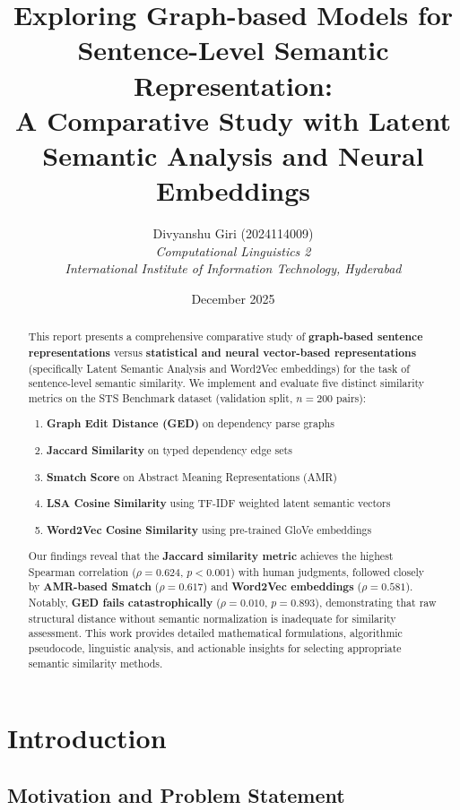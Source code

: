 \documentclass[11pt,a4paper]{article}
\title{Exploring Graph-based Models for Sentence-Level Semantic Representation:\\
A Comparative Study with Latent Semantic Analysis and Neural Embeddings}
\author{Divyanshu Giri (2024114009)\\
\textit{Computational Linguistics 2}\\
\textit{International Institute of Information Technology, Hyderabad}}
\date{December 2025}
\begin{document}
\maketitle

\begin{abstract}
This report presents a comprehensive comparative study of \textbf{graph-based sentence representations} versus \textbf{statistical and neural vector-based representations} (specifically Latent Semantic Analysis and Word2Vec embeddings) for the task of sentence-level semantic similarity. We implement and evaluate five distinct similarity metrics on the STS Benchmark dataset (validation split, $n=200$ pairs):
\begin{enumerate}[noitemsep]
    \item \textbf{Graph Edit Distance (GED)} on dependency parse graphs
    \item \textbf{Jaccard Similarity} on typed dependency edge sets
    \item \textbf{Smatch Score} on Abstract Meaning Representations (AMR)
    \item \textbf{LSA Cosine Similarity} using TF-IDF weighted latent semantic vectors
    \item \textbf{Word2Vec Cosine Similarity} using pre-trained GloVe embeddings
\end{enumerate}
Our findings reveal that the \textbf{Jaccard similarity metric} achieves the highest Spearman correlation ($\rho = 0.624$, $p < 0.001$) with human judgments, followed closely by \textbf{AMR-based Smatch} ($\rho = 0.617$) and \textbf{Word2Vec embeddings} ($\rho = 0.581$). Notably, \textbf{GED fails catastrophically} ($\rho = 0.010$, $p = 0.893$), demonstrating that raw structural distance without semantic normalization is inadequate for similarity assessment. This work provides detailed mathematical formulations, algorithmic pseudocode, linguistic analysis, and actionable insights for selecting appropriate semantic similarity methods.
\end{abstract}

\section{Introduction}

\subsection{Motivation and Problem Statement}
\end{document}
